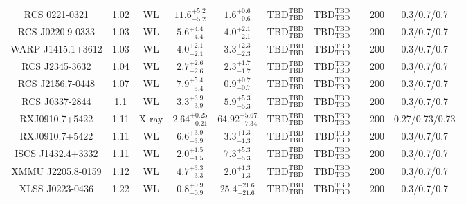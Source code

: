 \begin{table}
\begin{tabular}{cccccccccc}
RCS 0221-0321 & 1.02 & WL & ${11.6}^{+5.2}_{-5.2}$ & ${1.6}^{+0.6}_{-0.6}$ & ${\mathrm{TBD}}^{\mathrm{TBD}}_{\mathrm{TBD}}$ & ${\mathrm{TBD}}^{\mathrm{TBD}}_{\mathrm{TBD}}$ & \citet{SE14.1} & 200 & 0.3/0.7/0.7 \\
RCS J0220.9-0333 & 1.03 & WL & ${5.6}^{+4.4}_{-4.4}$ & ${4.0}^{+2.1}_{-2.1}$ & ${\mathrm{TBD}}^{\mathrm{TBD}}_{\mathrm{TBD}}$ & ${\mathrm{TBD}}^{\mathrm{TBD}}_{\mathrm{TBD}}$ & \citet{SE14.1} & 200 & 0.3/0.7/0.7 \\
WARP J1415.1+3612 & 1.03 & WL & ${4.0}^{+2.1}_{-2.1}$ & ${3.3}^{+2.3}_{-2.3}$ & ${\mathrm{TBD}}^{\mathrm{TBD}}_{\mathrm{TBD}}$ & ${\mathrm{TBD}}^{\mathrm{TBD}}_{\mathrm{TBD}}$ & \citet{SE14.1} & 200 & 0.3/0.7/0.7 \\
RCS J2345-3632 & 1.04 & WL & ${2.7}^{+2.6}_{-2.6}$ & ${2.3}^{+1.7}_{-1.7}$ & ${\mathrm{TBD}}^{\mathrm{TBD}}_{\mathrm{TBD}}$ & ${\mathrm{TBD}}^{\mathrm{TBD}}_{\mathrm{TBD}}$ & \citet{SE14.1} & 200 & 0.3/0.7/0.7 \\
RCS J2156.7-0448 & 1.07 & WL & ${7.9}^{+5.4}_{-5.4}$ & ${0.9}^{+0.7}_{-0.7}$ & ${\mathrm{TBD}}^{\mathrm{TBD}}_{\mathrm{TBD}}$ & ${\mathrm{TBD}}^{\mathrm{TBD}}_{\mathrm{TBD}}$ & \citet{SE14.1} & 200 & 0.3/0.7/0.7 \\
RCS J0337-2844 & 1.1 & WL & ${3.3}^{+3.9}_{-3.9}$ & ${5.9}^{+5.3}_{-5.3}$ & ${\mathrm{TBD}}^{\mathrm{TBD}}_{\mathrm{TBD}}$ & ${\mathrm{TBD}}^{\mathrm{TBD}}_{\mathrm{TBD}}$ & \citet{SE14.1} & 200 & 0.3/0.7/0.7 \\
RXJ0910.7+5422 & 1.11 & X-ray & ${2.64}^{+0.25}_{-0.21}$ & ${64.92}^{+5.67}_{-7.34}$ & ${\mathrm{TBD}}^{\mathrm{TBD}}_{\mathrm{TBD}}$ & ${\mathrm{TBD}}^{\mathrm{TBD}}_{\mathrm{TBD}}$ & \citet{BA14.1} & 200 & 0.27/0.73/0.73 \\
RXJ0910.7+5422 & 1.11 & WL & ${6.6}^{+3.9}_{-3.9}$ & ${3.3}^{+1.3}_{-1.3}$ & ${\mathrm{TBD}}^{\mathrm{TBD}}_{\mathrm{TBD}}$ & ${\mathrm{TBD}}^{\mathrm{TBD}}_{\mathrm{TBD}}$ & \citet{SE14.1} & 200 & 0.3/0.7/0.7 \\
ISCS J1432.4+3332 & 1.11 & WL & ${2.0}^{+1.5}_{-1.5}$ & ${7.3}^{+5.3}_{-5.3}$ & ${\mathrm{TBD}}^{\mathrm{TBD}}_{\mathrm{TBD}}$ & ${\mathrm{TBD}}^{\mathrm{TBD}}_{\mathrm{TBD}}$ & \citet{SE14.1} & 200 & 0.3/0.7/0.7 \\
XMMU J2205.8-0159 & 1.12 & WL & ${4.7}^{+3.3}_{-3.3}$ & ${2.0}^{+1.3}_{-1.3}$ & ${\mathrm{TBD}}^{\mathrm{TBD}}_{\mathrm{TBD}}$ & ${\mathrm{TBD}}^{\mathrm{TBD}}_{\mathrm{TBD}}$ & \citet{SE14.1} & 200 & 0.3/0.7/0.7 \\
XLSS J0223-0436 & 1.22 & WL & ${0.8}^{+0.9}_{-0.9}$ & ${25.4}^{+21.6}_{-21.6}$ & ${\mathrm{TBD}}^{\mathrm{TBD}}_{\mathrm{TBD}}$ & ${\mathrm{TBD}}^{\mathrm{TBD}}_{\mathrm{TBD}}$ & \citet{SE14.1} & 200 & 0.3/0.7/0.7 \\

\end{tabular}
\end{table}
